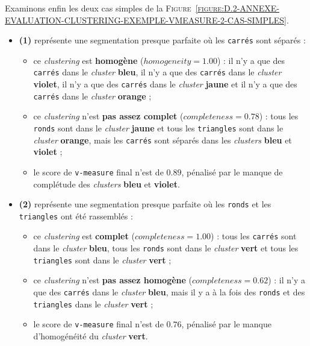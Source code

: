 		Examinons enfin les deux cas simples de la \textsc{Figure~\ref{figure:D.2-ANNEXE-EVALUATION-CLUSTERING-EXEMPLE-VMEASURE-2-CAS-SIMPLES}}.
		\begin{itemize}
			\item \textbf{(1)} représente une segmentation presque parfaite où les \texttt{carrés} sont séparés :
			\begin{itemize}
				\item ce \textit{clustering} est \textbf{homogène} ($homogeneity=1.00$) : il n'y a que des \texttt{carrés} dans le \textit{cluster} \textbf{\textcolor{colorSilverLakeBlue}{bleu}}, il n'y a que des \texttt{carrés} dans le \textit{cluster} \textbf{\textcolor{colorDarkPastelPurple}{violet}}, il n'y a que des \texttt{carrés} dans le \textit{cluster} \textbf{\textcolor{colorMinionYellow}{jaune}} et il n'y a que des \texttt{carrés} dans le \textit{cluster} \textbf{\textcolor{colorCarrotOrange}{orange}} ;
				\item ce \textit{clustering} n'est \textbf{pas assez complet} ($completeness=0.78$) : tous les \texttt{ronds} sont dans le \textit{cluster} \textbf{\textcolor{colorMinionYellow}{jaune}} et tous les \texttt{triangles} sont dans le \textit{cluster} \textbf{\textcolor{colorCarrotOrange}{orange}}, mais les \texttt{carrés} sont séparés dans les \textit{clusters} \textbf{\textcolor{colorSilverLakeBlue}{bleu}} et \textbf{\textcolor{colorDarkPastelPurple}{violet}} ;
				\item le score de \texttt{v-measure} final n'est de $0.89$, pénalisé par le manque de complétude des \textit{clusters} \textbf{\textcolor{colorSilverLakeBlue}{bleu}} et \textbf{\textcolor{colorDarkPastelPurple}{violet}}.
			\end{itemize}
			\item \textbf{(2)} représente une segmentation presque parfaite où les \texttt{ronds} et les \texttt{triangles} ont été rassemblés :
			\begin{itemize}
				\item ce \textit{clustering} est \textbf{complet} ($completeness=1.00$) : tous les \texttt{carrés} sont dans le \textit{cluster} \textbf{\textcolor{colorSilverLakeBlue}{bleu}}, tous les \texttt{ronds} sont dans le \textit{cluster} \textbf{\textcolor{colorDarkPastelGreen}{vert}} et tous les \texttt{triangles} sont dans le \textit{cluster} \textbf{\textcolor{colorDarkPastelGreen}{vert}} ;
				\item ce \textit{clustering} n'est \textbf{pas assez homogène} ($completeness=0.62$) : il n'y a que des \texttt{carrés} dans le \textit{cluster} \textbf{\textcolor{colorSilverLakeBlue}{bleu}}, mais il y a à la fois des \texttt{ronds} et des \texttt{triangles} dans le \textit{cluster} \textbf{\textcolor{colorDarkPastelGreen}{vert}} ;
				\item le score de \texttt{v-measure} final n'est de $0.76$, pénalisé par le manque d'homogénéité du \textit{cluster} \textbf{\textcolor{colorDarkPastelGreen}{vert}}.
			\end{itemize}
		\end{itemize}
	
	